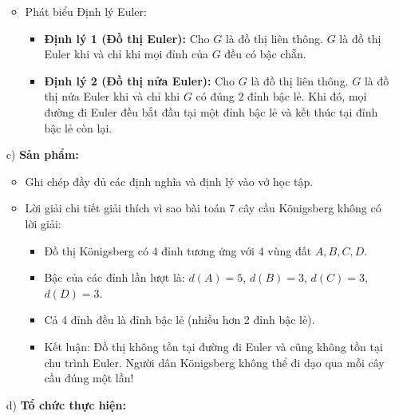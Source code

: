 \documentclass[12pt, a4paper]{article}
\begin{document}
\begin{itemize}[leftmargin=1.2cm]
\begin{itemize}[leftmargin=0.6cm]
\begin{itemize}
        \end{itemize}
        \item Phát biểu Định lý Euler:
        \begin{itemize}
            \item \textbf{Định lý 1 (Đồ thị Euler):} Cho $G$ là đồ thị liên thông. $G$ là đồ thị Euler khi và chỉ khi mọi đỉnh của $G$ đều có bậc chẵn.
            \item \textbf{Định lý 2 (Đồ thị nửa Euler):} Cho $G$ là đồ thị liên thông. $G$ là đồ thị nửa Euler khi và chỉ khi $G$ có đúng 2 đỉnh bậc lẻ. Khi đó, mọi đường đi Euler đều bắt đầu tại một đỉnh bậc lẻ và kết thúc tại đỉnh bậc lẻ còn lại.
        \end{itemize}
    \end{itemize}

    \item[c)] \textbf{Sản phẩm:}
    \begin{itemize}[leftmargin=0.6cm]
        \item Ghi chép đầy đủ các định nghĩa và định lý vào vở học tập.
        \item Lời giải chi tiết giải thích vì sao bài toán 7 cây cầu Königsberg không có lời giải:
        \begin{itemize}
            \item Đồ thị Königsberg có 4 đỉnh tương ứng với 4 vùng đất $A, B, C, D$.
            \item Bậc của các đỉnh lần lượt là: $d(A) = 5$, $d(B) = 3$, $d(C) = 3$, $d(D) = 3$.
            \item Cả 4 đỉnh đều là đỉnh bậc lẻ (nhiều hơn 2 đỉnh bậc lẻ).
            \item Kết luận: Đồ thị không tồn tại đường đi Euler và cũng không tồn tại chu trình Euler. Người dân Königsberg không thể đi dạo qua mỗi cây cầu đúng một lần!
        \end{itemize}
    \end{itemize}

    \item[d)] \textbf{Tổ chức thực hiện:}
\end{itemize}
\end{document}

